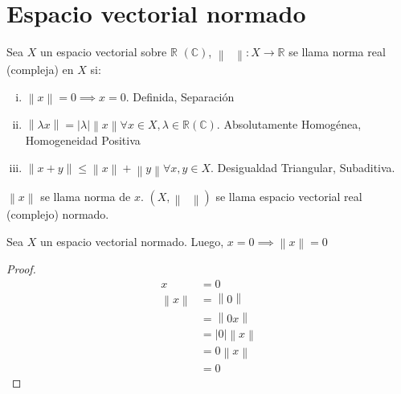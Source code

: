 \section{Espacio vectorial normado}

\begin{definition*}
    Sea $X$ un espacio vectorial sobre $\mathbb{R}$ $\left(\mathbb{C}\right)$, $\left\|\phantom{\cdot}\right\|\colon X\to\mathbb{R}$ se llama norma real (compleja) en $X$ si:
    \begin{enumerate}[i)]
        \item

              \begin{math}
                  \left\|x\right\|=
                  0\implies
                  x=0
              \end{math}.
              Definida, Separación

        \item

              \begin{math}
                  \left\|\lambda x\right\|=
                  \left|\lambda\right|
                  \left\|x\right\|
                  \forall x\in X, \lambda\in\mathbb{R} \left(\mathbb{C}\right)
              \end{math}.
              Absolutamente Homogénea,
              Homogeneidad Positiva

        \item

              \begin{math}
                  \left\|x+y\right\|\leq
                  \left\|x\right\|+
                  \left\|y\right\|
                  \forall x, y\in X
              \end{math}.
              Desigualdad Triangular, Subaditiva.
    \end{enumerate}
    $\left\|x\right\|$ se llama norma de $x$.
    $\left(X, \left\|\phantom{\cdot}\right\|\right)$ se llama espacio vectorial real (complejo) normado.
\end{definition*}

\begin{proposition*}
    Sea $X$ un espacio vectorial normado.
    Luego,
    \begin{math}
        x=0\implies
        \left\|x\right\|=0
    \end{math}
\end{proposition*}

\begin{proof}
    \begin{align*}
        x                & =0                               \\
        \left\|x\right\| & =\left\|0\right\|                \\
                         & =\left\|0x\right\|               \\
                         & = \left|0\right|\left\|x\right\| \\
                         & = 0\left\|x\right\|              \\
                         & =0
    \end{align*}
\end{proof}


